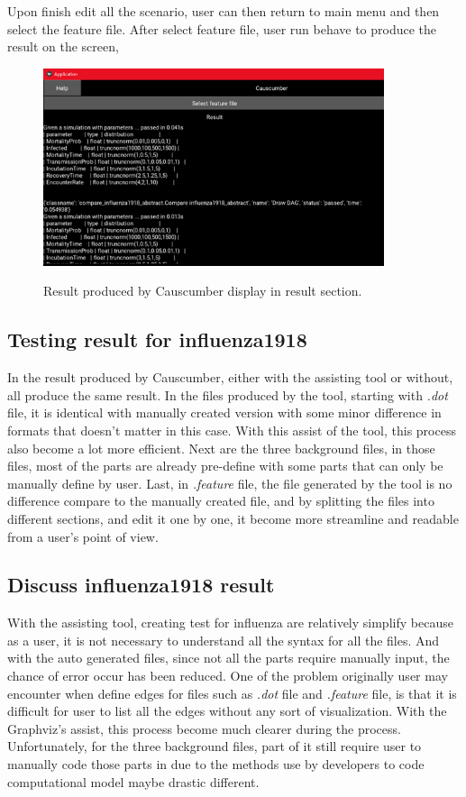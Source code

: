 Upon finish edit all the scenario, user can then return to main menu and then select the feature file. After select feature file, user run behave to produce the result on the screen,
\begin{figure}[H]
	\centering
	\includegraphics[width=10cm]{figures/influenzaTestProcess15.png}\\
	\caption{Result produced by Causcumber display in result section.}
	\label{fig:figure33}
\end{figure}

\subsection{Testing result for influenza1918}
In the result produced by Causcumber, either with the assisting tool or without, all produce the same result. In the files produced by the tool, starting with \textsl{.dot} file, it is identical with manually created version with some minor difference in formats that doesn’t matter in this case. With this assist of the tool, this process also become a lot more efficient. Next are the three background files, in those files, most of the parts are already pre-define with some parts that can only be manually define by user. Last, in \textsl{.feature} file, the file generated by the tool is no difference compare to the manually created file, and by splitting the files into different sections, and edit it one by one, it become more streamline and readable from a user’s point of view. 
\subsection{Discuss influenza1918 result}
With the assisting tool, creating test for influenza are relatively simplify because as a user, it is not necessary to understand all the syntax for all the files. And with the auto generated files, since not all the parts require manually input, the chance of error occur has been reduced. One of the problem originally user may encounter when define edges for files such as \textsl{.dot} file and \textsl{.feature} file, is that it is difficult for user to list all the edges without any sort of visualization. With the Graphviz’s assist, this process become much clearer during the process. Unfortunately, for the three background files, part of it still require user to manually code those parts in due to the methods use by developers to code computational model maybe drastic different.

